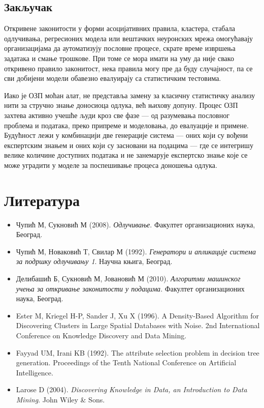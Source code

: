 \subsection{Закључак}
Откривене законитости у форми асоцијативних правила, кластера, стабала одлучивања, регресионих модела или вештачких неуронских мрежа омогућавају организацијама да аутоматизују пословне процесе, скрате време извршења задатака и смање трошкове. При томе се мора имати на уму да није свако откривено правило законитост, нека правила могу пре да буду случајност, па се сви добијени модели обавезно евалуирају са статистичким тестовима.

Иако је ОЗП моћан алат, не представља замену за класичну статистичку анализу нити за стручно знање доносиоца одлука, већ њихову допуну. Процес ОЗП захтева активно учешће људи кроз све фазе — од разумевања пословног проблема и података, преко припреме и моделовања, до евалуације и примене. Будућност лежи у комбинацији две генерације система — оних који су вођени експертским знањем и оних који су засновани на подацима — где се интегришу велике количине доступних података и не занемарује експертско знање које се може уградити у моделе за поспешивање процеса доношења одлука.

\section{Литература}
\begin{itemize}
  \item Чупић М, Сукновић М (2008). \textit{Одлучивање}. Факултет организационих наука, Београд.
  \item Чупић М, Новаковић Т, Свилар М (1992). \textit{Генератори и апликације система за подршку одлучивању 1}. Научна књига, Београд.
  \item Делибашић Б, Сукновић М, Јовановић М (2010). \textit{Алгоритми машинског учења за откривање законитости у подацима}. Факултет организационих наука, Београд.
  \item Ester M, Kriegel H-P, Sander J, Xu X (1996). A Density-Based Algorithm for Discovering Clusters in Large Spatial Databases with Noise. 2nd International Conference on Knowledge Discovery and Data Mining.
  \item Fayyad UM, Irani KB (1992). The attribute selection problem in decision tree generation. Proceedings of the Tenth National Conference on Artificial Intelligence.
  \item Larose D (2004). \textit{Discovering Knowledge in Data, an Introduction to Data Mining}. John Wiley \& Sons.
\end{itemize}